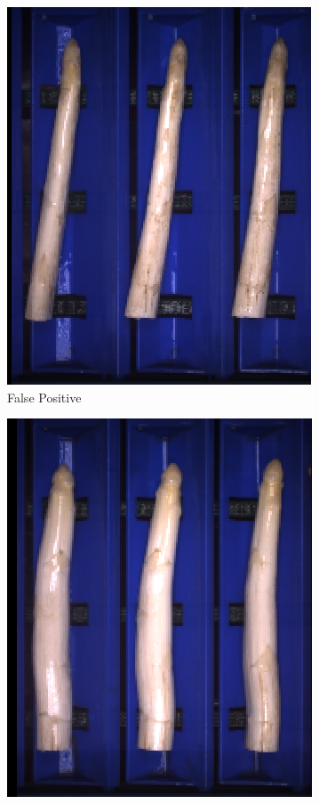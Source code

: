 \begin{figure}[h]
	\begin{subfigure}{0.3\textwidth}
		\includegraphics[width=0.9\linewidth]{Figures/appendix/thick_falsepositive_01.png} 
		\vspace{-5pt}
		\caption{False Positive}
	\end{subfigure}
	\begin{subfigure}{0.3\textwidth}
		\includegraphics[width=0.9\linewidth]{Figures/appendix/thick_falsepositive_02.png}

\end{subfigure}
\end{figure}
